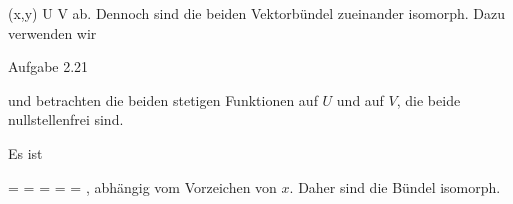 {\mavergleichskettedisp
{\vergleichskette
{ (x,y)
}
{ \in} { U \cap V
}
{ } {
}
{ } {
}
{ } {
}
}
{}{}{}
ab. Dennoch sind die beiden Vektorbündel zueinander isomorph. Dazu verwenden wir

Aufgabe 2.21

und betrachten die beiden stetigen Funktionen
 auf $U$ und
 auf $V$, die beide nullstellenfrei sind.

Es ist

\mavergleichskettedisp
{\vergleichskette
{ {  }   \cdot {}
}
{ =} { {  }  
}
{ =} { {  }
}
{ =} { {  }
}
{ =} { {  }
}
}
{
\vergleichskettefortsetzung
{ =} { 
}
{ } {
}
{ } {}
{ } {}
}{}{,}
abhängig vom Vorzeichen von $x$. Daher sind die Bündel isomorph.





}
